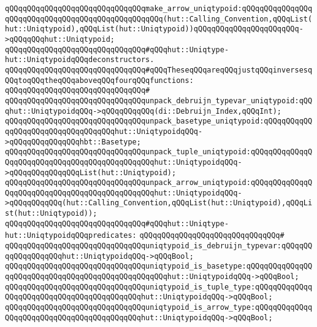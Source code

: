 \verb|qQQqqQQqqQQqqQQqqQQqqQQqqQQqqQQqmake_arrow_uniqtypoid:qQQqqQQqqQQqqQQqqQQqqQQqqQQqqQQqqQQqqQQqqQQqqQQqqQQq(hut::Calling_Convention,qQQqList(hut::Uniqtypoid),qQQqList(hut::Uniqtypoid))qQQqqQQqqQQqqQQqqQQqqQQq->qQQqqQQqhut::Uniqtypoid;|\newline
\newline
\verb|qQQqqQQqqQQqqQQqqQQqqQQqqQQqqQQq#qQQqhut::Uniqtype-hut::UniqtypoidqQQqdeconstructors.|\newline
\verb|qQQqqQQqqQQqqQQqqQQqqQQqqQQqqQQq#qQQqTheseqQQqareqQQqjustqQQqinversesqQQqtoqQQqtheqQQqaboveqQQqfourqQQqfunctions:|\newline
\verb|qQQqqQQqqQQqqQQqqQQqqQQqqQQqqQQq#|\newline
\verb|qQQqqQQqqQQqqQQqqQQqqQQqqQQqqQQqunpack_debruijn_typevar_uniqtypoid:qQQqhut::UniqtypoidqQQq->qQQqqQQqqQQq(di::Debruijn_Index,qQQqInt);|\newline
\verb|qQQqqQQqqQQqqQQqqQQqqQQqqQQqqQQqunpack_basetype_uniqtypoid:qQQqqQQqqQQqqQQqqQQqqQQqqQQqqQQqqQQqhut::UniqtypoidqQQq->qQQqqQQqqQQqqQQqhbt::Basetype;|\newline
\verb|qQQqqQQqqQQqqQQqqQQqqQQqqQQqqQQqunpack_tuple_uniqtypoid:qQQqqQQqqQQqqQQqqQQqqQQqqQQqqQQqqQQqqQQqqQQqqQQqhut::UniqtypoidqQQq->qQQqqQQqqQQqqQQqList(hut::Uniqtypoid);|\newline
\verb|qQQqqQQqqQQqqQQqqQQqqQQqqQQqqQQqunpack_arrow_uniqtypoid:qQQqqQQqqQQqqQQqqQQqqQQqqQQqqQQqqQQqqQQqqQQqqQQqhut::UniqtypoidqQQq->qQQqqQQqqQQq(hut::Calling_Convention,qQQqList(hut::Uniqtypoid),qQQqList(hut::Uniqtypoid));|\newline
\newline
\verb|qQQqqQQqqQQqqQQqqQQqqQQqqQQqqQQq#qQQqhut::Uniqtype-hut::UniqtypoidqQQqpredicates:|\newline
\verb|qQQqqQQqqQQqqQQqqQQqqQQqqQQqqQQq#|\newline
\verb|qQQqqQQqqQQqqQQqqQQqqQQqqQQqqQQquniqtypoid_is_debruijn_typevar:qQQqqQQqqQQqqQQqqQQqhut::UniqtypoidqQQq->qQQqBool;|\newline
\verb|qQQqqQQqqQQqqQQqqQQqqQQqqQQqqQQquniqtypoid_is_basetype:qQQqqQQqqQQqqQQqqQQqqQQqqQQqqQQqqQQqqQQqqQQqqQQqqQQqhut::UniqtypoidqQQq->qQQqBool;|\newline
\verb|qQQqqQQqqQQqqQQqqQQqqQQqqQQqqQQquniqtypoid_is_tuple_type:qQQqqQQqqQQqqQQqqQQqqQQqqQQqqQQqqQQqqQQqqQQqhut::UniqtypoidqQQq->qQQqBool;|\newline
\verb|qQQqqQQqqQQqqQQqqQQqqQQqqQQqqQQquniqtypoid_is_arrow_type:qQQqqQQqqQQqqQQqqQQqqQQqqQQqqQQqqQQqqQQqqQQqhut::UniqtypoidqQQq->qQQqBool;|\newline
